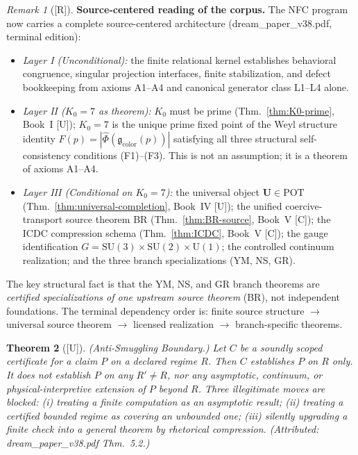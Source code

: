 \documentclass[12pt,oneside]{amsbook}
\theoremstyle{plain}
\newtheorem{theorem}{Theorem}[section]
\theoremstyle{definition}
\theoremstyle{remark}
\newtheorem{remark}[theorem]{Remark}
\newcommand{\status}[1]{\textup{[#1]}}
\begin{document}
\begin{remark}[\status{R}]\label{rem:terminal-source-reading}
\textbf{Source-centered reading of the corpus.}
The NFC program now carries a complete source-centered architecture
(dream\_paper\_v38.pdf, terminal edition):
\begin{itemize}
  \item \emph{Layer I (Unconditional):} the finite relational kernel
    establishes behavioral congruence, singular projection interfaces,
    finite stabilization, and defect bookkeeping from axioms A1--A4
    and canonical generator class L1--L4 alone.
  \item \emph{Layer II ($K_0 = 7$ as theorem):} $K_0$ must be prime
    (Thm.~\ref{thm:K0-prime}, Book~I [U]); $K_0 = 7$ is the unique
    prime fixed point of the Weyl structure identity
    $F(p) = |\hat\Phi(\mathfrak{g}_{\mathrm{color}}(p))|$ satisfying
    all three structural self-consistency conditions (F1)--(F3).
    This is not an assumption; it is a theorem of axioms A1--A4.
  \item \emph{Layer III (Conditional on $K_0 = 7$):} the universal
    object $\mathbf{U} \in \mathrm{POT}$
    (Thm.~\ref{thm:universal-completion}, Book~IV [U]); the unified
    coercive-transport source theorem BR
    (Thm.~\ref{thm:BR-source}, Book~V [C]); the ICDC compression
    schema (Thm.~\ref{thm:ICDC}, Book~V [C]); the gauge
    identification $G = \mathrm{SU}(3) \times \mathrm{SU}(2) \times
    \mathrm{U}(1)$; the controlled continuum realization; and the
    three branch specializations (YM, NS, GR).
\end{itemize}
The key structural fact is that the YM, NS, and GR branch theorems
are \emph{certified specializations of one upstream source theorem}
(BR), not independent foundations.  The terminal dependency order is:
finite source structure $\to$ universal source theorem $\to$ licensed
realization $\to$ branch-specific theorems.
\end{remark}

\begin{theorem}[\status{U}]\label{thm:anti-smuggling-boundary}
\textup{(Anti-Smuggling Boundary.)}
Let $C$ be a soundly scoped certificate for a claim $P$ on a
declared regime $R$.  Then $C$ establishes $P$ on $R$ only.  It
does not establish $P$ on any $R' \neq R$, nor any asymptotic,
continuum, or physical-interpretive extension of $P$ beyond $R$.
Three illegitimate moves are blocked: (i) treating a finite
computation as an asymptotic result; (ii) treating a certified
bounded regime as covering an unbounded one; (iii) silently upgrading
a finite check into a general theorem by rhetorical compression.
(Attributed: dream\_paper\_v38.pdf Thm.~5.2.)
\end{theorem}
\end{document}
